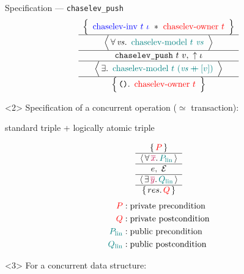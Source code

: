 \begin{frame}{Specification --- \texttt{chaselev\_push}}
\centering
\[
	\atripleExtPretty{
		\tikz[baseline, remember picture]{\node[anchor=base] (inv_1) {${
			\textcolor{blue}{\mathrm{chaselev \mathhyphen inv}\ t\ \iota}
		}$}} \iSep
		\tikz[baseline, remember picture]{\node[anchor=base] (owner_1) {${
			\textcolor{red}{\mathrm{chaselev \mathhyphen owner}\ t}
		}$}}
	}{
		\mathit{vs}
	}{
		\tikz[baseline, remember picture]{\node[anchor=base] (model_1) {${
			\textcolor{teal}{\mathrm{chaselev \mathhyphen model}\ t\ \mathit{vs}}
		}$}}
	}{
		\texttt{chaselev\_push}\ t\ v
	}{
		\uparrow\iota
	}{
	}{
		\tikz[baseline, remember picture]{\node[anchor=base] (model_2) {${
			\textcolor{teal}{\mathrm{chaselev \mathhyphen model}\ t\ (\mathit{vs} \mdoubleplus [v])}
		}$}}
	}{
		\exprUnit
	}{
		\tikz[baseline, remember picture]{\node[anchor=base] (owner_2) {${
			\textcolor{red}{\mathrm{chaselev \mathhyphen owner}\ t}
		}$}}
	}
\]
\begin{overbox}<2>
	\small
	\centering
	Specification of a concurrent operation ($\simeq$ transaction):
	
	standard triple + logically atomic triple
	
	\[
		\atripleExtPretty{
			\textcolor{red}{P}
		}{
			\textcolor{purple}{\overline{x}}
		}{
			\textcolor{teal}{P_\mathrm{lin}}
		}{
			e
		}{
			\mathcal{E}
		}{
			\textcolor{purple}{\overline{y}}
		}{
			\textcolor{teal}{Q_\mathrm{lin}}
		}{
			res
		}{
			\textcolor{red}{Q}
		}
	\]
	\begin{align*}
			\textcolor{red}{P}
			&:
			\text{private precondition}
		\\
			\textcolor{red}{Q}
			&:
			\text{private postcondition}
		\\
			\textcolor{teal}{P_\mathrm{lin}}
			&:
			\text{public precondition}
		\\
			\textcolor{teal}{Q_\mathrm{lin}}
			&:
			\text{public postcondition}
	\end{align*}
\end{overbox}
\begin{overbox}<3>
	For a concurrent data structure:
	

\end{overbox}
\end{frame}
